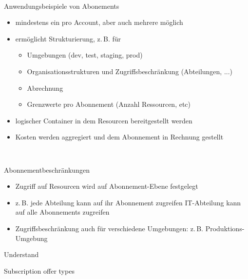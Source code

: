 \documentclass{scrartcl}
\newenvironment{flashcard}[2][]{%
    #1
    \vfill
    \centerline{\Large{#2}}
    \vfill
\newpage
}
{\newpage}
\begin{document}
    \begin{flashcard}[\ ]{Anwendungsbeispiele von Abonements}
        \begin{itemize}
            \item mindestens ein pro Account, aber auch mehrere möglich
            \item ermöglicht Strukturierung, z.\,B. für
            \begin{itemize}
                \item Umgebungen (dev, test, staging, prod)
                \item Organisationsstrukturen und Zugriffsbeschränkung (Abteilungen, ...)
                \item Abrechnung
                \item Grenzwerte pro Abonnement (Anzahl Ressourcen, etc)
            \end{itemize}
            \item logischer Container in dem Resourcen bereitgestellt werden
            \item Kosten werden aggregiert und dem Abonnement in Rechnung gestellt
        \end{itemize}
    \end{flashcard}

    \begin{flashcard}[\ ]{Abonnementbeschränkungen}
        \begin{itemize}
            \item Zugriff auf Resourcen wird auf Abonnement-Ebene festgelegt
            \item z.\,B. jede Abteilung kann auf ihr Abonnement zugreifen\newline
            IT-Abteilung kann auf alle Abonnements zugreifen
            \item Zugriffsbeschränkung auch für verschiedene Umgebungen:\newline
            z.\,B. Produktions-Umgebung
        \end{itemize}
    \end{flashcard}

    \begin{flashcard}[Understand]{Subscription offer types}

    \end{flashcard}
\end{document}
